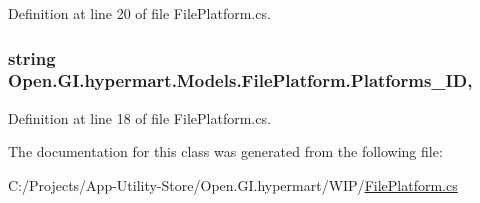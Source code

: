 Definition at line 20 of file File\+Platform.\+cs.

\hypertarget{class_open_1_1_g_i_1_1hypermart_1_1_models_1_1_file_platform_afe9e1d6e156cababf5d2123d21556d5f}{}
\subsubsection[{Platforms\+\_\+\+I\+D}]{\setlength{\rightskip}{0pt plus 5cm}string Open.\+G\+I.\+hypermart.\+Models.\+File\+Platform.\+Platforms\+\_\+\+I\+D\hspace{0.3cm}{\ttfamily [get]}, {\ttfamily [set]}}\label{class_open_1_1_g_i_1_1hypermart_1_1_models_1_1_file_platform_afe9e1d6e156cababf5d2123d21556d5f}


Definition at line 18 of file File\+Platform.\+cs.



The documentation for this class was generated from the following file\+:\begin{DoxyCompactItemize}
\item 
C\+:/\+Projects/\+App-\/\+Utility-\/\+Store/\+Open.\+G\+I.\+hypermart/\+W\+I\+P/\hyperlink{_file_platform_8cs}{File\+Platform.\+cs}\end{DoxyCompactItemize}
